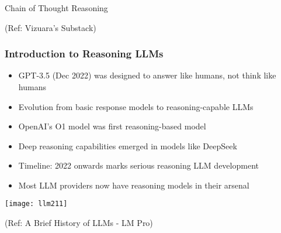 \begin{frame}[fragile]\frametitle{}
\begin{center}
{\Large Chain of Thought Reasoning}

{\tiny (Ref: Vizuara's Substack)}

\end{center}

\end{frame}


\begin{frame}[fragile]\frametitle{Introduction to Reasoning LLMs}

      \begin{itemize}
        \item GPT-3.5 (Dec 2022) was designed to answer like humans, not think like humans
        \item Evolution from basic response models to reasoning-capable LLMs
        \item OpenAI's O1 model was first reasoning-based model
        \item Deep reasoning capabilities emerged in models like DeepSeek
        \item Timeline: 2022 onwards marks serious reasoning LLM development
        \item Most LLM providers now have reasoning models in their arsenal
      \end{itemize}

        \begin{center}
        \texttt{[image: llm211]}
		
		{\tiny (Ref: A Brief History of LLMs - LM Pro)}

        \end{center}	

\end{frame}

